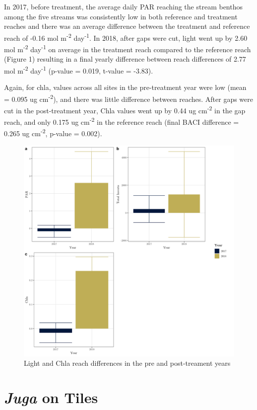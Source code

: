 \documentclass[double,12pt]{beavtex}
\begin{document}
  In 2017, before treatment, the average daily PAR reaching the stream
  benthos among the five streams was consistently low in both reference
  and treatment reaches and there was an average difference between the
  treatment and reference reach of -0.16 mol m\textsuperscript{-2}
  day\textsuperscript{-1}. In 2018, after gaps were cut, light went up by
  2.60 mol m\textsuperscript{-2} day\textsuperscript{-1} on average in the
  treatment reach compared to the reference reach (Figure 1) resulting in
  a final yearly difference between reach differences of 2.77 mol
  m\textsuperscript{-2} day\textsuperscript{-1} (p-value = 0.019, t-value
  = -3.83).
  
  Again, for chla, values across all sites in the pre-treatment year were
  low (mean = 0.095 ug cm\textsuperscript{-2}), and there was little
  difference between reaches. After gaps were cut in the post-treatment
  year, Chla values went up by 0.44 ug cm\textsuperscript{-2} in the gap
  reach, and only 0.175 ug cm\textsuperscript{-2} in the reference reach
  (final BACI difference = 0.265 ug cm\textsuperscript{-2}, p-value =
  0.002).
  
  \begin{figure}
  
  {\centering \includegraphics[width=0.6\linewidth]{Figures/Vars_Reach_Diffs} 
  
  }
  
  \caption[Light and Chla reach differences in the pre and post-treament years \label{Chla-Light}]{Light and Chla reach differences in the pre and post-treament years \label{Chla-Light}}\label{fig:unnamed-chunk-1}
  \end{figure}
  
  \section*{\texorpdfstring{\emph{Juga} on
  Tiles}{Juga on Tiles}}\label{juga-on-tiles}
  
\end{document}
